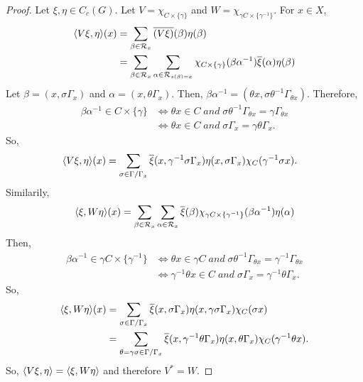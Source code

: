 \begin{proof}
  Let $\xi, \eta \in C_c(G)$.
  Let $V = \chi_{C\times \{\gamma\}}$ and $W = \chi_{\gamma C \times \{\gamma^{-1}\}}$.
  For $x \in X$,
  \begin{align*}
    \langle V\xi,\eta\rangle(x) &= \sum_{\beta \in \mathcal{R}_x} \overline{(V\xi)}(\beta)\eta(\beta)\\
    &= \sum_{\beta \in \mathcal{R}_x} \sum_{\alpha \in \mathcal{R}_{s(\beta)=x}} \chi_{C\times \{\gamma\}}(\beta \alpha^{-1})\overline{\xi}(\alpha)\eta(\beta)
  \end{align*}
  Let $\beta = (x, \sigma \Gamma_x)$ and $\alpha = (x, \theta \Gamma_x)$.
  Then, $\beta\alpha^{-1} = (\theta x, \sigma \theta^{-1}\Gamma_{\theta x})$.
  Therefore,
  \begin{align*}
    \beta \alpha^{-1} \in C \times \{\gamma\} &\Leftrightarrow \theta x \in C \;and\; \sigma \theta^{-1}\Gamma_{\theta x} = \gamma \Gamma_{\theta x} \\
    &\Leftrightarrow \theta x \in C \;and\; \sigma \Gamma_x = \gamma \theta \Gamma_x.
  \end{align*}
  So,
  \begin{align*}
    \langle V\xi,\eta\rangle(x) &= \sum_{\sigma \in \Gamma/\Gamma_x} \overline{\xi}(x,\gamma^{-1}\sigma\Gamma_x)\eta(x,\sigma\Gamma_x) \chi_C(\gamma^{-1}\sigma x).
  \end{align*}
  Similarily,
  \begin{align*}
    \langle\xi,W\eta\rangle(x) = \sum_{\beta \in \mathcal{R}_x}\sum_{\alpha \in \mathcal{R}_x}\overline{\xi}(\beta)\chi_{\gamma C \times \{\gamma^{-1}\}}(\beta\alpha^{-1})\eta(\alpha)
  \end{align*}
  Then,
  \begin{align*}
    \beta \alpha^{-1} \in \gamma C \times \{\gamma^{-1}\} &\Leftrightarrow \theta x \in \gamma C \;and\; \sigma \theta^{-1}\Gamma_{\theta x} = \gamma^{-1} \Gamma_{\theta x} \\
    &\Leftrightarrow \gamma^{-1}\theta x \in C \;and\; \sigma \Gamma_x = \gamma^{-1} \theta \Gamma_x.
  \end{align*}
  So,
  \begin{align*}
    \langle\xi,W\eta\rangle(x) &= \sum_{\sigma \in \Gamma/\Gamma_x} \overline{\xi}(x,\sigma\Gamma_x)\eta(x,\gamma\sigma\Gamma_x) \chi_C(\sigma x)\\
    &= \sum_{\theta = \gamma \sigma \in \Gamma/\Gamma_x} \overline{\xi}(x,\gamma^{-1}\theta\Gamma_x)\eta(x,\theta\Gamma_x) \chi_C(\gamma^{-1}\theta x).
  \end{align*}
  So, $\langle V\xi,\eta\rangle = \langle\xi,W\eta\rangle$ and therefore $V^* = W$.
  


\end{proof}
